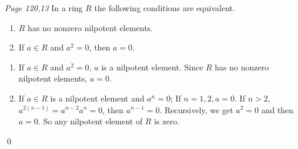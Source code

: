 \begin{enumerate}
\prob
\textit{Page 120,13 }%
In a ring $R$ the following conditions are equivalent.
\begin{enumerate}
	\item $R$ has no nonzero nilpotent elements.
	\item If $a\in R$ and $a^2=0$, then $a=0$.
\end{enumerate}
\soln

\begin{enumerate}
	\item If $a\in R$ and $a^2=0$, $a$ is a nilpotent element. 
	Since $R$ has no nonzero nilpotent elements, $a=0$.
	\item If $a\in R$ is a nilpotent element and $a^n=0$; 
	If $n=1,2,a=0$. If $n> 2$, $a^{2(n-1)}=a^{n-2}a^n=0$, then $a^{n-1}=0$. 
	Recursively, we get $a^2=0$ and then $a=0$. So any nilpotent element of $R$ is zero.
\end{enumerate}	
\qed

\end{enumerate}
